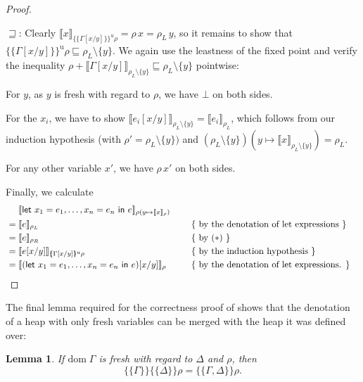 \documentclass{jfp1}
\newtheorem{lemma}{Lemma}
\theoremstyle{nonumberbreak}
\newtheorem{proof}{Proof}
\newcommand{\sLet}[2]{\text{\textsf{let}}\ #1\ \text{\textsf{in}}\ #2}
\newcommand{\dom}[1]{\text{dom}\;#1}
\newcommand{\xeng}{x_1 = e_1, \ldots, x_n = e_n}
\newcommand{\dsem}[2]{\llbracket #1 \rrbracket_{#2}}
\newcommand{\esem}[1]{\{\!\!\!\{#1\}\!\!\!\}}
\newcommand{\esemu}[1]{\{\!\!\!\{#1\}\!\!\!\}^{\text{u}}}
\newcommand{\beginright}{&\mathrel{\phantom{=}}}
\newcommand{\aexpl}[1]{&\mathrel{\phantom{=}}\left\{\text{ #1 }\right\}}
\begin{document}
\begin{proof}
\begin{compactitem}[$\sqsubseteq$:]
\item[$\sqsupseteq$:]
Clearly $\dsem{x}{\esemu{\Gamma[x/y]}\rho} = \rho\, x = \rho_L\, y$, so it remains to show that $\esemu{\Gamma[x/y]}{\rho} \sqsubseteq \rho_L \setminus \{y\}$. We again use the leastness of the fixed point and verify the inequality
$\rho + \dsem{\Gamma[x/y]}{\rho_L\setminus\{y\}} \sqsubseteq \rho_L\setminus\{y\}$ pointwise:
\begin{compactitem}
\item For $y$, as $y$ is fresh with regard to $\rho$, we have $\bot$ on both sides.
\item For the $x_i$, we have to show $\dsem{e_i[x/y]}{\rho_L \setminus \{y\}} = \dsem{e_i}{\rho_L}$, which follows from our induction hypothesis (with $\rho' = \rho_L \setminus\{y\})$ and $(\rho_L \setminus\{y\})(y \mapsto \dsem{x}{\rho_L\setminus\{y\}}) = \rho_L$.
\item For any other variable $x'$, we have $\rho\, x'$ on both sides.
\end{compactitem}
\end{compactitem}

Finally, we calculate
\begin{align*}
\beginright
\dsem{\sLet{\xeng}e}{\rho (y \mapsto \dsem{x}{\rho})} \\
&= \dsem{e}{\rho_L} &
\aexpl{by the denotation of let expressions} \\
&= \dsem{e}{\rho_R} &
\aexpl{by $(\ast)$} \\
&= \dsem{e[x/y]}{\esemu{\Gamma[x/y]}{\rho}} &
\aexpl{by the induction hypothesis}  \\
&= \dsem{ (\sLet{\xeng}e)[x/y]}{\rho} &
\aexpl{by the denotation of let expressions.}
\end{align*}
\end{proof}

The final lemma required for the correctness proof of shows that the denotation of a heap with only fresh variables can be merged with the heap it was defined over:

\begin{lemma}
\label{lem:esem-merge}
If $\dom \Gamma$ is fresh with regard to $\Delta$ and $\rho$, then
\[
\esem{\Gamma}{\esem{\Delta}\rho} = \esem{\Gamma, \Delta}\rho.
\]
\end{lemma}
\end{document}
